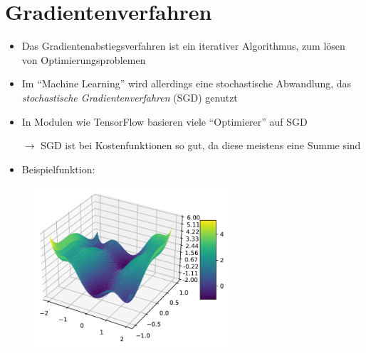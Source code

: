 \documentclass[t]{beamer}
\begin{document}
\section{Gradientenverfahren}
\begin{frame}
    \begin{itemize}
        \item Das Gradientenabstiegsverfahren ist ein iterativer Algorithmus, zum lösen von Optimierungsproblemen \newline
        \item Im \enquote{Machine Learning} wird allerdings eine stochastische Abwandlung, das \emph{stochastische Gradientenverfahren} (SGD) genutzt \newline
        \item In Modulen wie TensorFlow basieren viele \enquote{Optimierer} auf SGD \newline
        \item[\(\rightarrow\)] SGD ist bei Kostenfunktionen so gut, da diese meistens eine Summe sind
    \end{itemize}
\end{frame}

\begin{frame}
    \begin{itemize}
        \item Beispielfunktion:
    \end{itemize}
    \begin{figure}
        \centering
        \includegraphics[width=0.65\textwidth]{./images/six-hump-camel-function-crop.pdf}
    \end{figure}
\end{frame}
\end{document}
